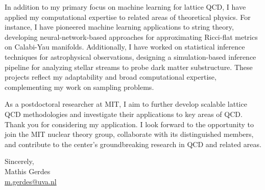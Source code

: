 \documentclass[11pt]{article}
\begin{document}
In addition to my primary focus on machine learning for lattice QCD, I have applied my computational expertise to related areas of theoretical physics. For instance, I have pioneered machine learning applications to string theory, developing neural-network-based approaches for approximating Ricci-flat metrics on Calabi-Yau manifolds. Additionally, I have worked on statistical inference techniques for astrophysical observations, designing a simulation-based inference pipeline for analyzing stellar streams to probe dark matter substructure. These projects reflect my adaptability and broad computational expertise, complementing my work on sampling problems.

As a postdoctoral researcher at MIT, I aim to further develop scalable lattice QCD methodologies and investigate their applications to key areas of QCD. Thank you for considering my application. I look forward to the opportunity to join the MIT nuclear theory group, collaborate with its distinguished members, and contribute to the center's groundbreaking research in QCD and related areas.


\vspace{15pt}
\noindent
\flushright
Sincerely, \\
Mathis Gerdes \\
\href{mailto:m.gerdes@uva.nl}{m.gerdes@uva.nl}
\end{document}
